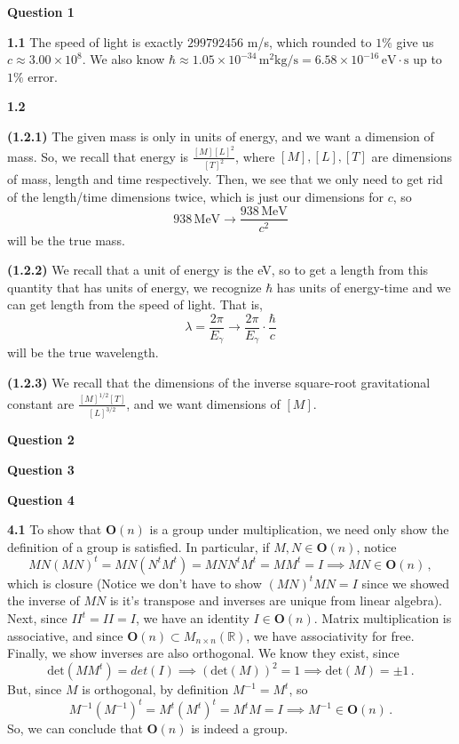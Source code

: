 \documentclass[10pt]{article}
\newcommand{\R}{\mathbb{R}}
\begin{document}
\textbf{Question 1}

\textbf{1.1} The speed of light is exactly $299792456$ m/s, which rounded to $1\% $ give us $c \approx 3.00\times 10^{8}$. We also know $\hbar \approx 1.05 \times 10 ^{-34} \, \text{m}^{2}\text{kg}/\text{s} = 6.58 \times 10^{-16} \, \text{eV}\cdot \text{s}$ up to $1\% $ error.

\textbf{1.2}

\textbf{(1.2.1)} The given mass is only in units of energy, and we want a dimension of mass. So, we recall that energy is $\frac{[M][L]^{2}}{[T]^{2}}$, where $[M],[L],[T]$ are dimensions of mass, length and time respectively. Then, we see that we only need to get rid of the length/time dimensions twice, which is just our dimensions for $c$, so
\[ 938 \,\text{MeV} \to \frac{938 \, \text{MeV}}{c^{2}} \]
will be the true mass.

\textbf{(1.2.2)} We recall that a unit of energy is the eV, so to get a length from this quantity that has units of energy, we recognize $\hbar$ has units of energy-time and we can get length from the speed of light. That is,
\[ \lambda = \frac{2\pi}{E_{\gamma}} \to \frac{2\pi}{E_{\gamma}}\cdot \frac{\hbar}{c} \]
will be the true wavelength.

\textbf{(1.2.3)} We recall that the dimensions of the inverse square-root gravitational constant are $\frac{[M]^{1/2}[T]}{[L]^{3/2}}$, and we want dimensions of $[M]$. 

\textbf{Question 2}

\textbf{Question 3}

\textbf{Question 4}

\textbf{4.1}  To show that $\textbf{O}(n)$ is a group under multiplication, we need only show the definition of a group is satisfied. In particular, if $M,N \in \textbf{O}(n)$, notice
\[ MN(MN)^{t} = MN(N^{t}M^{t}) = MNN^{t}M^{t} = MM^{t} = I \implies MN \in \textbf{O}(n) \, ,\]
which is closure (Notice we don't have to show $(MN)^{t}MN = I$ since we showed the inverse of $MN$ is it's transpose and inverses are unique from linear algebra). Next, since $II^{t} = II = I$, we have an identity $I\in \textbf{O}(n)$. Matrix multiplication is associative, and since $\textbf{O}(n) \subset M_{n\times n}(\R)$, we have associativity for free. Finally, we show inverses are also orthogonal. We know they exist, since
\[ \text{det}(MM^{t}) = det(I) \implies (\text{det}(M))^{2} = 1 \implies \text{det}(M) = \pm 1\, .\]
But, since $M$ is orthogonal, by definition $M^{-1} = M^{t}$, so
\[ M^{-1}(M^{-1})^{t} = M^{t}(M^{t})^{t} = M^{t}M = I  \implies M^{-1} \in \textbf{O}(n)\, .\]
So, we can conclude that $\textbf{O}(n)$ is indeed a group.
\end{document}
